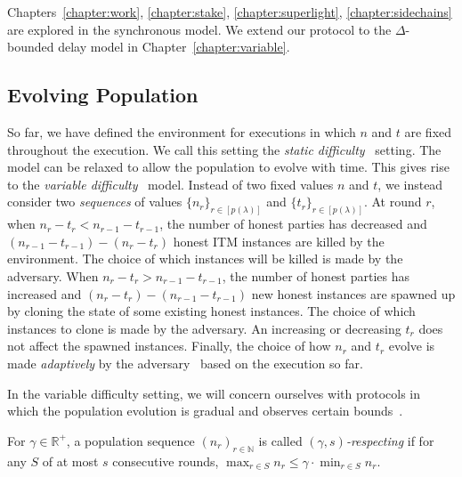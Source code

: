 Chapters~\ref{chapter:work},
\ref{chapter:stake}, \ref{chapter:superlight}, \ref{chapter:sidechains} are
explored in the synchronous model. We extend our protocol to the $\Delta$-bounded
delay model in Chapter~\ref{chapter:variable}.

\subsection{Evolving Population}
So far, we have defined the environment for executions in which $n$ and $t$ are
fixed throughout the execution. We call this setting the
\emph{static difficulty}~\cite{backbone,backbone-new}
setting. The model can be relaxed to allow the population to evolve with time.
This gives rise to the
\emph{variable difficulty}~\cite{varbackbone}
model.
Instead of two fixed values $n$ and $t$, we instead consider two
\emph{sequences} of values
$\{n_r\}_{r \in [p(\lambda)]}$ and $\{t_r\}_{r \in [p(\lambda)]}$.
At round $r$, when $n_r - t_r < n_{r-1} - t_{r-1}$, the number of honest
parties has decreased and $(n_{r-1} - t_{r-1}) - (n_r - t_r)$ honest ITM
instances are killed by the environment. The choice of which instances will be
killed is made by the adversary. When
$n_r - t_r > n_{r-1} - t_{r-1}$, the number of honest parties has increased and
$(n_r - t_r) - (n_{r-1} - t_{r-1})$ new honest instances are spawned up by
cloning the state of some existing honest instances. The choice of which
instances to clone is made by the adversary. An increasing or decreasing $t_r$
does not affect the spawned instances. Finally, the choice of how $n_r$
and $t_r$ evolve is made \emph{adaptively} by the adversary~\cite{varbackbone-new}
based on the execution so far.



In the variable difficulty setting, we will concern ourselves with protocols in
which the population evolution is gradual and observes certain
bounds~\cite{varbackbone}.

\begin{definition}
  For $\gamma \in \mathbb{R}^+$, a population sequence
  $(n_r)_{r\in\mathbb{N}}$ is called \emph{$(\gamma, s)$-respecting} if for any
  $S$ of at most $s$ consecutive rounds,
  $\max_{r \in S}n_r \leq \gamma\cdot \min_{r \in S}n_r$.
\end{definition}

